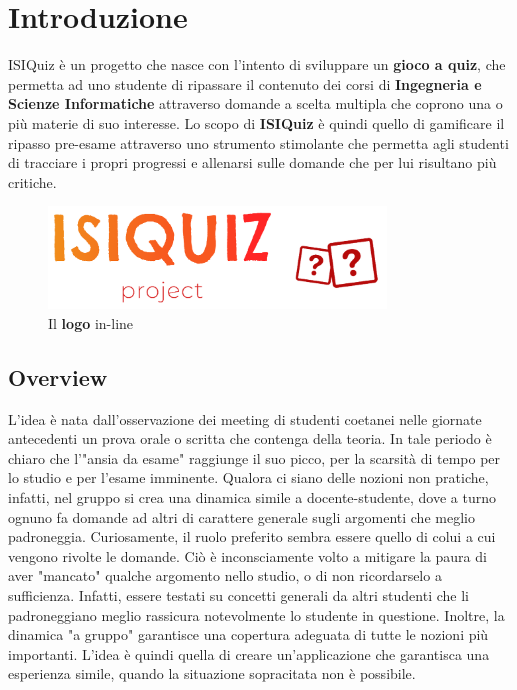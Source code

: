 

\chapter{Introduzione}
ISIQuiz è un progetto che nasce con l'intento di sviluppare un \textbf{gioco a quiz}, che permetta ad uno studente di ripassare il contenuto dei corsi di \textbf{Ingegneria e Scienze Informatiche} attraverso domande a scelta multipla che coprono una o più materie di suo interesse. Lo scopo di \textbf{ISIQuiz} è quindi quello di gamificare il ripasso pre-esame attraverso uno strumento stimolante che permetta agli studenti di tracciare i propri progressi e allenarsi sulle domande che per lui risultano più critiche.
\begin{figure}[H]
    \caption{Il \textbf{logo} in-line}
    \label{fig:Logo}
    \centering
    \includegraphics[width=0.8\textwidth]{Extra/ISIQuizLogoLineTransparent.png}
\end{figure}

\section{Overview}
L'idea è nata dall'osservazione dei meeting di studenti coetanei nelle giornate antecedenti un prova orale o scritta che contenga della teoria. In tale periodo è chiaro che l'"ansia da esame" raggiunge il suo picco, per la scarsità di tempo per lo studio e per l'esame imminente. Qualora ci siano delle nozioni non pratiche, infatti, nel gruppo si crea una dinamica simile a docente-studente, dove a turno ognuno fa domande ad altri di carattere generale sugli argomenti che meglio padroneggia. Curiosamente, il ruolo preferito sembra essere quello di colui a cui vengono rivolte le domande. Ciò è inconsciamente volto a mitigare la paura di aver "mancato" qualche argomento nello studio, o di non ricordarselo a sufficienza. Infatti, essere testati su concetti generali da altri studenti che li padroneggiano meglio rassicura notevolmente lo studente in questione. Inoltre, la dinamica "a gruppo" garantisce una copertura adeguata di tutte le nozioni più importanti. L'idea è quindi quella di creare un'applicazione che garantisca una esperienza simile, quando la situazione sopracitata non è possibile. 


